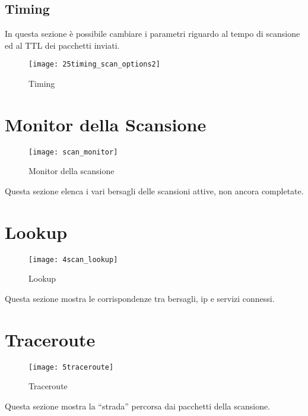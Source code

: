 \subsection{Timing}
\label{sec:ScanTiming}

In questa sezione \`e possibile cambiare i parametri riguardo al tempo di 
scansione ed al TTL dei pacchetti inviati.
\begin{figure}[h]
  \centering
  \texttt{[image: 25timing\_scan\_options2]}
  \caption{Timing}
  \label{fig:ScanTiming}
\end{figure}


\section{Monitor della Scansione}
\label{sec:ScanMonitor}

\begin{figure}[h]
  \centering
  \texttt{[image: scan\_monitor]}
  \caption{Monitor della scansione}
  \label{fig:ScanMonitor}
\end{figure}
Questa sezione elenca i vari bersagli delle scansioni attive, non ancora 
completate.

\section{Lookup}
\label{sec:Lookup}

\begin{figure}[h]
  \centering
  \texttt{[image: 4scan\_lookup]}
  \caption{Lookup}
  \label{fig:Lookup}
\end{figure}
Questa sezione mostra le corrispondenze tra bersagli, ip e servizi connessi.

\section{Traceroute}
\label{sec:Traceroute}

\begin{figure}[h]
  \centering
  \texttt{[image: 5traceroute]}
  \caption{Traceroute}
  \label{fig:Traceroute}
\end{figure}
Questa sezione mostra la ``strada'' percorsa dai pacchetti della scansione.

